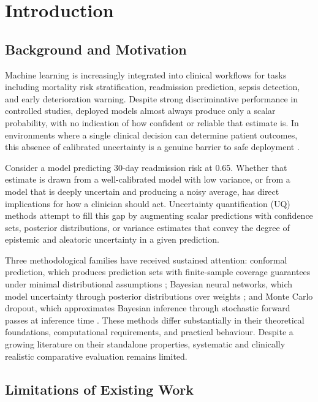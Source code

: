 \documentclass[11pt,a4paper]{article}
\begin{document}
\section{Introduction}
\label{sec:intro}

\subsection{Background and Motivation}

Machine learning is increasingly integrated into clinical workflows for tasks including mortality risk stratification, readmission prediction, sepsis detection, and early deterioration warning. Despite strong discriminative performance in controlled studies, deployed models almost always produce only a scalar probability, with no indication of how confident or reliable that estimate is. In environments where a single clinical decision can determine patient outcomes, this absence of calibrated uncertainty is a genuine barrier to safe deployment \citep{obermeyer2019}.

Consider a model predicting 30-day readmission risk at 0.65. Whether that estimate is drawn from a well-calibrated model with low variance, or from a model that is deeply uncertain and producing a noisy average, has direct implications for how a clinician should act. Uncertainty quantification (UQ) methods attempt to fill this gap by augmenting scalar predictions with confidence sets, posterior distributions, or variance estimates that convey the degree of epistemic and aleatoric uncertainty in a given prediction.

Three methodological families have received sustained attention: conformal prediction, which produces prediction sets with finite-sample coverage guarantees under minimal distributional assumptions \citep{vovk2005}; Bayesian neural networks, which model uncertainty through posterior distributions over weights \citep{blundell2015}; and Monte Carlo dropout, which approximates Bayesian inference through stochastic forward passes at inference time \citep{gal2016}. These methods differ substantially in their theoretical foundations, computational requirements, and practical behaviour. Despite a growing literature on their standalone properties, systematic and clinically realistic comparative evaluation remains limited.

\subsection{Limitations of Existing Work}
\end{document}
